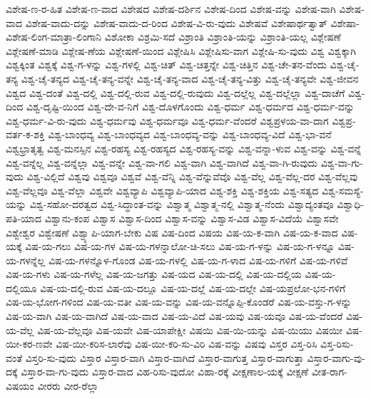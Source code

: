 {ವಿಶೇಷ-ಣ-ರ-ಹಿತ
ವಿಶೇಷ-ಣ-ವಾದ
ವಿಶೇಷದ
ವಿಶೇಷ-ದರ್ಶಿನ
ವಿಶೇಷ-ದಿಂದ
ವಿಶೇಷ-ವನ್ನು
ವಿಶೇಷ-ವಾಗಿ
ವಿಶೇಷ-ವಾದ
ವಿಶೇಷ-ವಾದು-ದನ್ನು
ವಿಶೇಷ-ವಾದು-ದ-ರಿಂದ
ವಿಶೇಷ-ವಿ-ರು-ವುದು
ವಿಶೇಷವೆ
ವಿಶೇಷಾರ್ಥತ್ವಾತ್
ವಿಶೇಷಾ-ವಿಶೇಷ-ಲಿಂಗ-ಮಾತ್ರಾ-ಲಿಂಗಾನಿ
ವಿಶೋಕಾ
ವಿಶ್ರಮಿ-ಸದೆ
ವಿಶ್ರಾಂತಿ
ವಿಶ್ರಾಂತಿ-ಯನ್ನು
ವಿಶ್ರಾಂತಿ-ಯಲ್ಲ
ವಿಶ್ಲೇಷಣೆ
ವಿಶ್ಲೇಷಣೆ-ಮಾಡಿ
ವಿಶ್ಲೇಷ-ಣೆಯ
ವಿಶ್ಲೇಷಣೆ-ಯಿಂದ
ವಿಶ್ಲೇಷಿಸಿ
ವಿಶ್ಲೇಷಿಸು-ವಾಗ
ವಿಶ್ಲೇಷಿ-ಸು-ವುದು
ವಿಶ್ವ
ವಿಶ್ವಕ್ಕಾಗಿ
ವಿಶ್ವಕ್ಕಿಂತ
ವಿಶ್ವಕ್ಕೆ
ವಿಶ್ವ-ಗ-ಳನ್ನು
ವಿಶ್ವ-ಗಳಲ್ಲಿ
ವಿಶ್ವ-ಚಿತ್
ವಿಶ್ವ-ಚಿತ್ತನ್ನೇ
ವಿಶ್ವ-ಚಿತ್ತಿನ
ವಿಶ್ವ-ಚೇ-ತನ-ವೆಂದು
ವಿಶ್ವ-ಚೈ-ತನ್ಯ
ವಿಶ್ವ-ಚೈ-ತನ್ಯದ
ವಿಶ್ವ-ಚೈ-ತನ್ಯ-ವನ್ನೇ
ವಿಶ್ವ-ಚೈ-ತನ್ಯ-ವಾದ
ವಿಶ್ವ-ಚೈ-ತನ್ಯ-ವಿತ್ತು
ವಿಶ್ವ-ಚೈ-ತನ್ಯವೇ
ವಿಶ್ವ-ಜೀವನ
ವಿಶ್ವದ
ವಿಶ್ವ-ದಂತೆ
ವಿಶ್ವ-ದಲ್ಲಿ
ವಿಶ್ವ-ದಲ್ಲಿ-ರುವ
ವಿಶ್ವ-ದಲ್ಲಿ-ರುವುದು
ವಿಶ್ವ-ದಲ್ಲೆಲ್ಲ
ವಿಶ್ವ-ದಲ್ಲೆಲ್ಲಾ
ವಿಶ್ವ-ದಾಚೆಗೆ
ವಿಶ್ವ-ದಿಂದ
ವಿಶ್ವ-ದೃಷ್ಟಿ-ಯಿಂದ
ವಿಶ್ವ-ದೇ-ವ-ನಿಗೆ
ವಿಶ್ವ-ದೊಳಗೊಂದು
ವಿಶ್ವ-ಧರ್ಮ
ವಿಶ್ವ-ಧರ್ಮದ
ವಿಶ್ವ-ಧರ್ಮ-ವನ್ನು
ವಿಶ್ವ-ಧರ್ಮ-ವಿ-ರು-ವುದು
ವಿಶ್ವ-ಧರ್ಮವು
ವಿಶ್ವ-ಧರ್ಮವೂ
ವಿಶ್ವ-ಧರ್ಮ-ವೆಂದರೆ
ವಿಶ್ವಪ್ರಳಯ-ವಾ-ದಾಗ
ವಿಶ್ವಪ್ರ-ವರ್ತ-ಕ-ಶಕ್ತಿ
ವಿಶ್ವ-ಬಾಂಧವ್ಯ
ವಿಶ್ವ-ಬಾಂಧವ್ಯದ
ವಿಶ್ವ-ಬಾಂಧವ್ಯ-ವನ್ನು
ವಿಶ್ವ-ಬಾಂಧವ್ಯ-ವಿದೆ
ವಿಶ್ವ-ಭಾ-ವನೆ
ವಿಶ್ವಭ್ರಾತೃತ್ವ
ವಿಶ್ವ-ಮನಸ್ಸಿನ
ವಿಶ್ವ-ರಹಸ್ಯ
ವಿಶ್ವ-ರಹಸ್ಯದ
ವಿಶ್ವ-ರಹಸ್ಯ-ವನ್ನು
ವಿಶ್ವ-ವನ್ನಾ-ಳುವ
ವಿಶ್ವ-ವನ್ನು
ವಿಶ್ವ-ವನ್ನೆ
ವಿಶ್ವ-ವನ್ನೆಲ್ಲ
ವಿಶ್ವ-ವನ್ನೆಲ್ಲಾ
ವಿಶ್ವ-ವನ್ನೇ
ವಿಶ್ವ-ವಾ-ಗಲಿ
ವಿಶ್ವ-ವಾಗಿ
ವಿಶ್ವ-ವಾಗಿದೆ
ವಿಶ್ವ-ವಾ-ಗಿ-ರುವುದು
ವಿಶ್ವ-ವಾ-ಗು-ವುದು
ವಿಶ್ವ-ವಿಲ್ಲಿದೆ
ವಿಶ್ವವು
ವಿಶ್ವವೂ
ವಿಶ್ವವೆ
ವಿಶ್ವ-ವೆನ್ನಿ
ವಿಶ್ವ-ವೆನ್ನುವೆವೊ
ವಿಶ್ವ-ವೆಲ್ಲ
ವಿಶ್ವ-ವೆಲ್ಲ-ದರ
ವಿಶ್ವ-ವೆಲ್ಲವು
ವಿಶ್ವ-ವೆಲ್ಲವೂ
ವಿಶ್ವ-ವೆಲ್ಲಾ
ವಿಶ್ವವೇ
ವಿಶ್ವವ್ಯಾಪಿ
ವಿಶ್ವವ್ಯಾಪಿ-ಯಾದ
ವಿಶ್ವ-ಶಕ್ತಿ
ವಿಶ್ವ-ಶಕ್ತಿಯ
ವಿಶ್ವ-ಸತ್ಯದ
ವಿಶ್ವ-ಸಮಸ್ಯೆ-ಯನ್ನು
ವಿಶ್ವ-ಸಹೋ-ದರತ್ವದ
ವಿಶ್ವ-ಸಿದ್ಧಾಂತ-ವನ್ನು
ವಿಶ್ವಾತ್ಮ
ವಿಶ್ವಾತ್ಮ-ನಲ್ಲಿ
ವಿಶ್ವಾತ್ಮ-ನೆಂದು
ವಿಶ್ವಾದ್ಯಂತವೂ
ವಿಶ್ವಾಧಿ-ಪತಿ-ಯಾದ
ವಿಶ್ವಾನು-ಕಂಪ
ವಿಶ್ವಾಸ
ವಿಶ್ವಾಸ-ದಿಂದ
ವಿಶ್ವಾಸ-ವನ್ನು
ವಿಶ್ವಾಸ-ವಿಡ
ವಿಶ್ವಾಸ-ವಿದೆಯೆ
ವಿಶ್ವಾಸವೇ
ವಿಶ್ವೇಶ್ವರ
ವಿಶ್ವೇಷಣೆ
ವಿಶ್ವ್ಯಾಪಿ-ಯಾಗ-ಬೇಕು
ವಿಷ
ವಿಷ-ದಿಂದ
ವಿಷಯ
ವಿಷ-ಯ-ಕ-ವಾಗಿ
ವಿಷ-ಯ-ಕ-ವಾದ
ವಿಷ-ಯಕ್ಕೆ
ವಿಷ-ಯ-ಗಲು
ವಿಷ-ಯ-ಗಳ
ವಿಷ-ಯ-ಗಳನ್ನಾಲೋ-ಚಿ-ಸಲು
ವಿಷ-ಯ-ಗ-ಳನ್ನು
ವಿಷ-ಯ-ಗ-ಳನ್ನೂ
ವಿಷ-ಯ-ಗಳನ್ನೆಲ್ಲ
ವಿಷ-ಯ-ಗಳನ್ನೊಳ-ಗೊಂಡ
ವಿಷ-ಯ-ಗಳಲ್ಲಿ
ವಿಷ-ಯ-ಗ-ಳಾದ
ವಿಷ-ಯ-ಗಳಿಗೆ
ವಿಷ-ಯ-ಗಳಿವೆ
ವಿಷ-ಯ-ಗಳು
ವಿಷ-ಯ-ಗಳೆಲ್ಲ
ವಿಷ-ಯ-ಜಗತ್ತು
ವಿಷ-ಯದ
ವಿಷ-ಯ-ದಲ್ಲಿ
ವಿಷ-ಯ-ದಲ್ಲಿಯ
ವಿಷ-ಯ-ದಲ್ಲಿಯೂ
ವಿಷ-ಯ-ದಲ್ಲಿ-ರುವ
ವಿಷ-ಯ-ದಲ್ಲೂ
ವಿಷ-ಯ-ದಲ್ಲೆ
ವಿಷ-ಯ-ದಲ್ಲೇ
ವಿಷ-ಯಪ್ರಲೋ-ಭನ-ಗಳಿಗೆ
ವಿಷ-ಯ-ಭೋಗ-ಗಳಿಂದ
ವಿಷ-ಯ-ವತೀ
ವಿಷ-ಯ-ವನ್ನು
ವಿಷ-ಯ-ವನ್ನೊಪ್ಪಿ-ಕೊಂಡರೆ
ವಿಷ-ಯ-ವಸ್ತು-ಗ-ಳನ್ನು
ವಿಷ-ಯ-ವಾಗಿ
ವಿಷ-ಯ-ವಾಗಿದೆ
ವಿಷ-ಯ-ವಾದ
ವಿಷ-ಯ-ವಿದೆ
ವಿಷ-ಯವು
ವಿಷ-ಯವೂ
ವಿಷ-ಯ-ವೆಂದರೆ
ವಿಷ-ಯ-ವೆಲ್ಲ
ವಿಷ-ಯ-ವೆಲ್ಲವೂ
ವಿಷ-ಯವೇ
ವಿಷ-ಯಾಪೇಕ್ಷೀ
ವಿಷಯಿ
ವಿಷ-ಯಿ-ಯನ್ನು
ವಿಷ-ಯಿಯು
ವಿಷಯೀ
ವಿಷ-ಯೀ-ಕರ-ಣವೇ
ವಿಷ-ಯೀ-ಕರಿಸ-ಲಾರೆವು
ವಿಷ-ಯೀ-ಕರಿ-ಸು-ವಿರಿ
ವಿಷ-ವನ್ನು
ವಿಷವು
ವಿಸ್ತರ
ವಿಸ್ತ-ರಿಸಿ
ವಿಸ್ತ-ರಿಸು-ವಂತೆ
ವಿಸ್ತರಿ-ಸು-ವುದು
ವಿಸ್ತಾರ
ವಿಸ್ತಾರ-ವಾಗಿ
ವಿಸ್ತಾರ-ವಾಗಿದೆ
ವಿಸ್ತಾರ-ವಾಗುತ್ತ
ವಿಸ್ತಾರ-ವಾಗುತ್ತಾ
ವಿಸ್ತಾರ-ವಾಗು-ವು-ದಕ್ಕೆ
ವಿಸ್ತಾರ-ವಾ-ಗು-ವುದು
ವಿಸ್ತಾರ-ವಾದ
ವಿಹ-ರಿಸು-ವುದೋ
ವಿಹಾ-ರಕ್ಕೆ
ವೀಕ್ಷಣಾಲ-ಯಕ್ಕೆ
ವೀಕ್ಷಣೆ
ವೀತ-ರಾಗ-ವಿಷಯಂ
ವೀರರು
ವೀರ-ರೆಲ್ಲಾ
}
